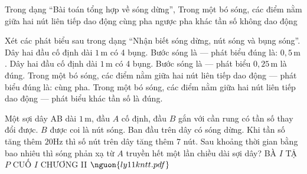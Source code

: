 \begin{ex}
Trong dạng “Bài toán tổng hợp về sóng dừng”, Trong một bó sóng, các điểm nằm giữa hai nút liên tiếp dao động
\choice
{\True cùng pha}
{ngược pha}
{khác tần số}
{không dao động}
\end{ex}

\begin{ex}
Xét các phát biểu sau trong dạng “Nhận biết sóng dừng, nút sóng và bụng sóng”.
\choiceTF
{\True Dây hai đầu cố định dài $1\,\text{m}$ có 4 bụng. Bước sóng là — phát biểu đúng là: $0,5\,\text{m}$.}
{Dây hai đầu cố định dài $1\,\text{m}$ có 4 bụng. Bước sóng là — phát biểu $0,25\,\text{m}$ là đúng.}
{\True Trong một bó sóng, các điểm nằm giữa hai nút liên tiếp dao động — phát biểu đúng là: cùng pha.}
{Trong một bó sóng, các điểm nằm giữa hai nút liên tiếp dao động — phát biểu khác tần số là đúng.}
\end{ex}

\begin{ex}
Một sợi dây AB dài $1\,\text{m}$, đầu $A$ cố định, đầu $B$ gắn với cần rung có tần số thay đổi được. $B$ được coi là nút sóng. Ban đầu trên dây có sóng dừng. Khi tần số tăng thêm $20 \mathrm{Hz}$ thì số nút trên dây tăng thêm 7 nút. Sau khoảng thời gian bằng bao nhiêu thì sóng phản xạ từ $A$ truyền hết một lần chiều dài sợi dây? BÀ $I$ TẬ $P$ CUỐ $I$ CHƯƠNG II $\nguon{ly11 kntt.pdf}$
\choiceTF

\end{ex}

